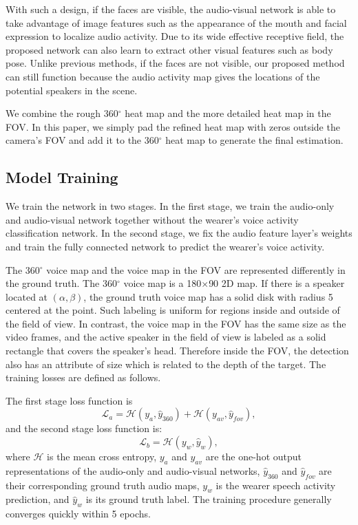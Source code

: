 \documentclass[10pt,twocolumn,letterpaper]{article}
\begin{document}
With such a design, 
if the faces are visible, the audio-visual network is able to take advantage of image features such as the appearance 
of the mouth and facial expression to localize audio activity. Due to its wide effective receptive field, 
the proposed network can also learn to extract other visual features such as body pose. 
Unlike previous methods, if the faces are not visible, our proposed method can still function because
the audio activity map gives the locations of the potential speakers in the scene.


We combine the rough 360$^{\circ}$ heat map and the more detailed heat map in the FOV. In this paper, we simply pad 
the refined heat map with zeros outside the camera's FOV and add it to the 360$^{\circ}$ heat map to generate the final estimation.

\subsection{Model Training} \label{sec:training}


We train the network in two stages. 
In the first stage, we train the audio-only and audio-visual network together without the wearer's voice activity classification network. 
In the second stage, we fix the audio feature layer's weights and train  
the fully connected network to predict the wearer's voice activity. 

The 360$^{\circ}$ voice map and the voice map in the FOV are represented
differently in the ground truth. The 360$^{\circ}$  voice map is a 180$\times$90 2D map. If there is a speaker located at $(\alpha, \beta)$,
the ground truth voice map has a solid disk with radius 5 centered at the point. Such labeling is uniform for regions 
inside and outside of the field of view. In contrast, the voice map in the FOV has the same size as the video frames, and 
the active speaker in the field of view is labeled as a solid rectangle that covers the speaker's
head. Therefore inside the FOV, the detection also has an attribute of size which is related to the depth of the target. The
training losses are defined as follows.

The first stage loss function is
\[
	\mathcal{L}_a = \mathcal{H}(y_{a}, \hat{y}_{360}) +  
	              \mathcal{H}(y_{av}, \hat{y}_{fov}),
\]
and the second stage loss function is:
\[
	\mathcal{L}_b = \mathcal{H}(y_{w}, \hat{y}_{w}),
\]	
where $\mathcal{H}$ is the mean cross entropy, 
$y_{a}$ and $y_{av}$ are the one-hot output representations of the audio-only and audio-visual networks, 
$\hat{y}_{360}$ and $\hat{y}_{fov}$ are their corresponding ground truth audio maps, 
$y_w$ is the wearer speech activity prediction, and $\hat{y}_{w}$ is its ground truth label.
The training procedure generally converges quickly within 5 epochs.  
\end{document}
